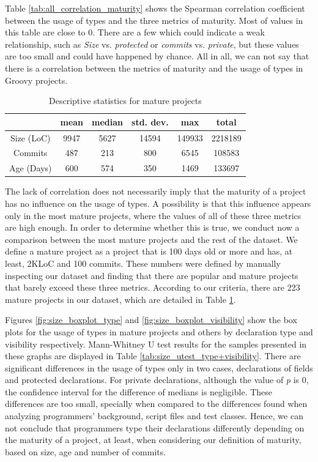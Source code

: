 \documentclass[preprint]{sigplanconf}
\renewcommand{\arraystretch}{1.2}
\begin{document}
Table \ref{tab:all_correlation_maturity} shows the Spearman correlation coefficient between the usage of types and the three metrics of maturity.
Most of values in this table are close to 0.
There are a few which could indicate a weak relationship, such as \emph{Size} vs. \emph{protected} or \emph{commits} vs. \emph{private}, but these values are too small and could have happened by chance.
All in all, we can not say that there is a correlation between the metrics of maturity and the usage of types in Groovy projects.
\begin{table}[h!]

\centering{}%
\renewcommand{\arraystretch}{1.2}

\begin{tabular}{|c|c|c|c|c|c|}
\hline
{}		& mean	& median	& std. dev.	& max	& total		\\
\hline
\hline
Size (LoC)	& 9947 	& 5627 & 14594  & 149933	& 2218189	\\ \hline
Commits   	& 487  	& 213    & 800   & 6545		& 108583	\\ \hline
Age (Days)  & 600  	& 574  & 350   & 1469		& 133697	\\ \hline
\end{tabular}
\caption{Descriptive statistics for mature projects}
\label{tab:mature_dataset_characterization}
\end{table}

The lack of correlation does not necessarily imply that the maturity of a project has no influence on the usage of types.
A possibility is that this influence appears only in the most mature projects, where the values of all of these three metrics are high enough.
In order to determine whether this is true, we conduct now a comparison between the most mature projects and the rest of the dataset.
We define a mature project as a project that is 100 days old or more and has, at least, 2KLoC and 100 commits.
These numbers were defined by manually inspecting our dataset and finding that there are popular and mature projects that barely exceed these three metrics.
According to our criteria, there are 223 mature projects in our dataset, which are detailed in Table \ref{tab:mature_dataset_characterization}.


Figures \ref{fig:size_boxplot_type}  and \ref{fig:size_boxplot_visibility} show the box plots for the usage of types in mature projects and others by declaration type and visibility respectively.
Mann-Whitney U test results for the samples presented in these graphs are displayed in Table \ref{tab:size_utest_type+visibility}.
There are significant differences in the usage of types only in two cases, declarations of fields and protected declarations.
For private declarations, although the value of \emph{p} is $0$, the confidence interval for the difference of medians is negligible.
These differences are too small, specially when compared to the differences found when analyzing programmers' background, script files and test classes.
Hence, we can not conclude that programmers type their declarations differently depending on the maturity of a project, at least, when considering our definition of maturity, based on size, age and number of commits.
\end{document}
